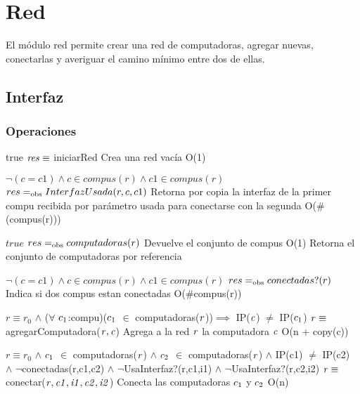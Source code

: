 \section{Red}
El módulo red permite crear una red de computadoras, agregar nuevas, conectarlas y averiguar el camino mínimo entre dos de ellas.


\subsection{Interfaz}


\subsubsection*{Operaciones}

 {true}
 {$\text{\textit{res}} \equiv$ iniciarRed}
 {Crea una red vacía}
 {O(1)}

{$\neg(c = c1) \land c \in compus(r) \land c1 \in compus(r)$}
{$res =_{\mathrm{obs}} InterfazUsada(r,c,c1)$}
{Retorna por copia la interfaz de la primer compu recibida por parámetro usada para conectarse con la segunda}
{O($\#$(compus(r)))}

{$true$}
{$res =_{\mathrm{obs}} computadoras(r)$}
{Devuelve el conjunto de compus}
{O(1)}
{Retorna el conjunto de computadoras por referencia}

{$\neg(c = c1) \land c \in compus(r) \land c1 \in compus(r)$}
{$res =_{\mathrm{obs}} conectadas?(r)$}
{Indica si dos compus estan conectadas}
{O($\#$compus(r))}
{}

 {$r \equiv r_0$ $\land$ ($\forall$ $\text{\textit{$c_{1}$}}$:compu)($\text{\textit{$c_{1}$}}$ $\in$ computadoras($\text{\textit{r}}$))$\implies$ IP($\text{\textit{c}}$) $\neq$ IP($\text{\textit{$c_{1}$}}$)}
 {$\text{\textit{r}} \equiv$ agregarComputadora($\text{\textit{r}},\text{\textit{c}}$)}
 {Agrega a la red $\text{\textit{r}}$ la computadora $\text{\textit{c}}$}
 {O(n + copy(c))}

 {$r \equiv r_0$ $\land$ $\text{\textit{$c_{1}$}}$ $\in$ computadoras($\text{\textit{r}}$) $\land$ $\text{\textit{$c_{2}$}}$ $\in$ computadoras($\text{\textit{r}}$) $\land$ IP(c1) $\neq$ IP(c2) \\ $\land$ $\neg$conectadas(r,c1,c2) $\land$ $\neg$UsaInterfaz?(r,c1,i1) $\land$ $\neg$UsaInterfaz?(r,c2,i2)}
 {$\text{\textit{r}} \equiv$ conectar($\text{\textit{r}},\text{\textit{c1}},\text{\textit{i1}},\text{\textit{c2}},\text{\textit{i2}}$)}
 {Conecta las computadoras $\text{\textit{$c_{1}$}}$ y $\text{\textit{$c_{2}$}}$}
 {O(n)}

